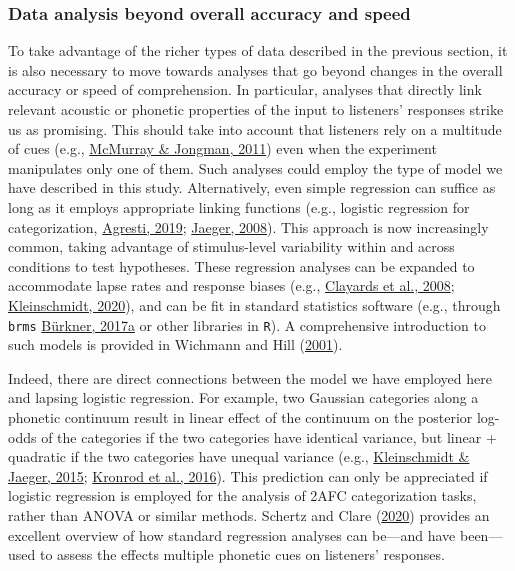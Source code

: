 \documentclass[
  11pt,
  man,floatsintext]{apa6}
\begin{document}
\hypertarget{data-analysis-beyond-overall-accuracy-and-speed}{%
\subsubsection{Data analysis beyond overall accuracy and speed}\label{data-analysis-beyond-overall-accuracy-and-speed}}

To take advantage of the richer types of data described in the previous section, it is also necessary to move towards analyses that go beyond changes in the overall accuracy or speed of comprehension. In particular, analyses that directly link relevant acoustic or phonetic properties of the input to listeners' responses strike us as promising. This should take into account that listeners rely on a multitude of cues (e.g., \protect\hyperlink{ref-mcmurray-jongman2011}{McMurray \& Jongman, 2011}) even when the experiment manipulates only one of them. Such analyses could employ the type of model we have described in this study. Alternatively, even simple regression can suffice as long as it employs appropriate linking functions (e.g., logistic regression for categorization, \protect\hyperlink{ref-agresti2019}{Agresti, 2019}; \protect\hyperlink{ref-jaeger2008}{Jaeger, 2008}). This approach is now increasingly common, taking advantage of stimulus-level variability within and across conditions to test hypotheses. These regression analyses can be expanded to accommodate lapse rates and response biases (e.g., \protect\hyperlink{ref-clayards2008}{Clayards et al., 2008}; \protect\hyperlink{ref-kleinschmidt2020}{Kleinschmidt, 2020}), and can be fit in standard statistics software (e.g., through \texttt{brms} \protect\hyperlink{ref-burkner2017}{Bürkner, 2017a} or other libraries in \texttt{R}). A comprehensive introduction to such models is provided in Wichmann and Hill (\protect\hyperlink{ref-wichmann-hill2001}{2001}).

Indeed, there are direct connections between the model we have employed here and lapsing logistic regression. For example, two Gaussian categories along a phonetic continuum result in linear effect of the continuum on the posterior log-odds of the categories if the two categories have identical variance, but linear + quadratic if the two categories have unequal variance (e.g., \protect\hyperlink{ref-kleinschmidt-jaeger2015}{Kleinschmidt \& Jaeger, 2015}; \protect\hyperlink{ref-kronrod2016}{Kronrod et al., 2016}). This prediction can only be appreciated if logistic regression is employed for the analysis of 2AFC categorization tasks, rather than ANOVA or similar methods. Schertz and Clare (\protect\hyperlink{ref-schertz-clare2020}{2020}) provides an excellent overview of how standard regression analyses can be---and have been---used to assess the effects multiple phonetic cues on listeners' responses.
\end{document}
